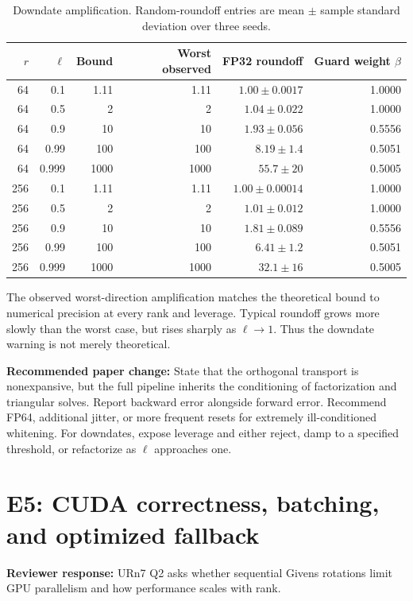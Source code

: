 \documentclass[11pt]{article}
\newcommand{\reviewer}[1]{\textbf{Reviewer response:} #1}
\newcommand{\paperchange}[1]{\textbf{Recommended paper change:} #1}
\begin{document}
\begin{table}[ht]
\centering
\small
\caption{Downdate amplification.  Random-roundoff entries are mean \(\pm\)
sample standard deviation over three seeds.}
\label{tab:e4-down}
\begin{tabular}{@{}rrrrrr@{}}
\toprule
\(r\) & \(\ell\) & Bound & Worst observed & FP32 roundoff &
Guard weight \(\beta\) \\
\midrule
64 & 0.1 & 1.11 & 1.11 & \(1.00\pm0.0017\) & 1.0000 \\
64 & 0.5 & 2 & 2 & \(1.04\pm0.022\) & 1.0000 \\
64 & 0.9 & 10 & 10 & \(1.93\pm0.056\) & 0.5556 \\
64 & 0.99 & 100 & 100 & \(8.19\pm1.4\) & 0.5051 \\
64 & 0.999 & 1000 & 1000 & \(55.7\pm20\) & 0.5005 \\
\midrule
256 & 0.1 & 1.11 & 1.11 & \(1.00\pm0.00014\) & 1.0000 \\
256 & 0.5 & 2 & 2 & \(1.01\pm0.012\) & 1.0000 \\
256 & 0.9 & 10 & 10 & \(1.81\pm0.089\) & 0.5556 \\
256 & 0.99 & 100 & 100 & \(6.41\pm1.2\) & 0.5051 \\
256 & 0.999 & 1000 & 1000 & \(32.1\pm16\) & 0.5005 \\
\bottomrule
\end{tabular}
\end{table}

The observed worst-direction amplification matches the theoretical bound to
numerical precision at every rank and leverage.  Typical roundoff grows more
slowly than the worst case, but rises sharply as \(\ell\to1\).  Thus the
downdate warning is not merely theoretical.

\paperchange{State that the orthogonal transport is nonexpansive, but the full
pipeline inherits the conditioning of factorization and triangular solves.
Report backward error alongside forward error.  Recommend FP64, additional
jitter, or more frequent resets for extremely ill-conditioned whitening.
For downdates, expose leverage and either reject, damp to a specified threshold,
or refactorize as \(\ell\) approaches one.}

\section{E5: CUDA correctness, batching, and optimized fallback}
\label{sec:e5}

\reviewer{URn7 Q2 asks whether sequential Givens rotations limit GPU
parallelism and how performance scales with rank.}
\end{document}
